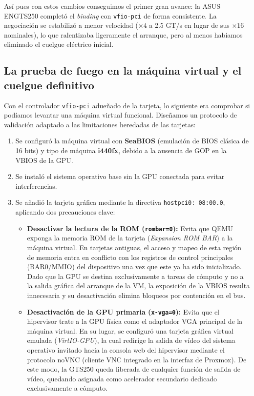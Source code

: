 Así pues con estos cambios conseguimos el primer gran avance: la ASUS ENGTS250 completó el \textit{binding} 
con \texttt{vfio-pci} de forma consistente. La negociación se estabilizó a menor velocidad ($\times 4$ 
a 2.5 GT/s en lugar de sus $\times 16$ nominales), lo que ralentizaba ligeramente el arranque, pero 
al menos habíamos eliminado el cuelgue eléctrico inicial.

\subsection{La prueba de fuego en la máquina virtual y el cuelgue definitivo}

Con el controlador \texttt{vfio-pci} adueñado de la tarjeta, lo siguiente era comprobar si podíamos levantar 
una máquina virtual funcional. Diseñamos un protocolo de validación adaptado a las limitaciones 
heredadas de las tarjetas:
\begin{enumerate}
    \item Se configuró la máquina virtual con \textbf{SeaBIOS} (emulación de BIOS clásica de 16 bits) 
    y tipo de máquina \textbf{i440fx}, debido a la ausencia de GOP en la VBIOS de la GPU.
    \item Se instaló el sistema operativo base sin la GPU conectada para evitar interferencias.
    \item Se añadió la tarjeta gráfica mediante la directiva \texttt{hostpci0: 08:00.0}, aplicando dos 
    precauciones clave:
    \begin{itemize}
        \item \textbf{Desactivar la lectura de la ROM (\texttt{rombar=0}):} Evita que QEMU exponga 
        la memoria ROM de la tarjeta (\textit{Expansion ROM BAR}) a la máquina virtual. En tarjetas 
        antiguas, el acceso y mapeo de esta región de memoria entra en conflicto con los registros 
        de control principales (BAR0/MMIO) del dispositivo una vez que este ya ha sido inicializado. 
        Dado que la GPU se destina exclusivamente a tareas de cómputo y no a la salida gráfica del 
        arranque de la VM, la exposición de la VBIOS resulta innecesaria y su desactivación elimina 
        bloqueos por contención en el bus.
        \item \textbf{Desactivación de la GPU primaria (\texttt{x-vga=0}):} Evita que el hipervisor 
        trate a la GPU física como el adaptador VGA principal de la máquina virtual. 
        En su lugar, se configuró una tarjeta gráfica virtual emulada 
        (\textit{VirtIO-GPU}), la cual redirige la salida de vídeo del sistema operativo invitado hacia 
        la consola web del hipervisor mediante el protocolo noVNC (cliente VNC integrado en la interfaz 
        de Proxmox). De este modo, la GTS250 queda liberada de cualquier función de salida de vídeo, 
        quedando asignada como acelerador secundario dedicado exclusivamente a cómputo.
    \end{itemize}
\end{enumerate}

